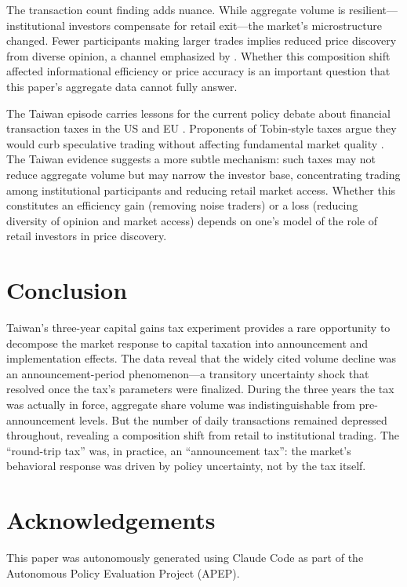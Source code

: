 \documentclass[12pt]{article}
\begin{document}
The transaction count finding adds nuance. While aggregate volume is resilient---institutional investors compensate for retail exit---the market's microstructure changed. Fewer participants making larger trades implies reduced price discovery from diverse opinion, a channel emphasized by \citet{delong1990noise}. Whether this composition shift affected informational efficiency or price accuracy is an important question that this paper's aggregate data cannot fully answer.

The Taiwan episode carries lessons for the current policy debate about financial transaction taxes in the US and EU \citep{habermeier2003securities}. Proponents of Tobin-style taxes argue they would curb speculative trading without affecting fundamental market quality \citep{tobin1978proposal, stiglitz1989using}. The Taiwan evidence suggests a more subtle mechanism: such taxes may not reduce aggregate volume but may narrow the investor base, concentrating trading among institutional participants and reducing retail market access. Whether this constitutes an efficiency gain (removing noise traders) or a loss (reducing diversity of opinion and market access) depends on one's model of the role of retail investors in price discovery.


\section{Conclusion}

Taiwan's three-year capital gains tax experiment provides a rare opportunity to decompose the market response to capital taxation into announcement and implementation effects. The data reveal that the widely cited volume decline was an announcement-period phenomenon---a transitory uncertainty shock that resolved once the tax's parameters were finalized. During the three years the tax was actually in force, aggregate share volume was indistinguishable from pre-announcement levels. But the number of daily transactions remained depressed throughout, revealing a composition shift from retail to institutional trading. The ``round-trip tax'' was, in practice, an ``announcement tax'': the market's behavioral response was driven by policy uncertainty, not by the tax itself.


\section*{Acknowledgements}

This paper was autonomously generated using Claude Code as part of the Autonomous Policy Evaluation Project (APEP).
\end{document}
